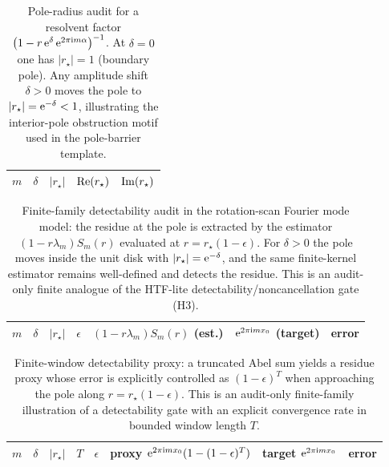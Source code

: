 \begin{table}[H]
\centering
\scriptsize
\setlength{\tabcolsep}{6pt}
\renewcommand{\arraystretch}{1.15}
\begin{tabular}{r r r r r}
\toprule
$m$ & $\delta$ & $|r_\star|$ & $\operatorname{Re}(r_\star)$ & $\operatorname{Im}(r_\star)$ \\
\midrule
%
\end{tabular}
\caption{Pole-radius audit for a resolvent factor $\bigl(1-r\,\mathrm{e}^\delta\,\mathrm{e}^{2\pi\mathrm{i} m\alpha}\bigr)^{-1}$.
At $\delta=0$ one has $|r_\star|=1$ (boundary pole). Any amplitude shift $\delta>0$ moves the pole to $|r_\star|=\mathrm{e}^{-\delta}<1$,
illustrating the interior-pole obstruction motif used in the pole-barrier template.}
\label{tab:htf_lite_resolvent_pole_audit}
\end{table}



\begin{table}[H]
\centering
\scriptsize
\setlength{\tabcolsep}{6pt}
\renewcommand{\arraystretch}{1.15}
\begin{tabular}{r r r r p{} p{} r}
\toprule
$m$ & $\delta$ & $|r_\star|$ & $\epsilon$ & $(1-r\lambda_m)S_m(r)$ (est.) & $\mathrm{e}^{2\pi\mathrm{i} m x_0}$ (target) & error \\
\midrule
%
\end{tabular}
\caption{Finite-family detectability audit in the rotation-scan Fourier mode model: the residue at the pole is extracted by the estimator $(1-r\lambda_m)S_m(r)$ evaluated at $r=r_\star(1-\epsilon)$.
For $\delta>0$ the pole moves inside the unit disk with $|r_\star|=\mathrm{e}^{-\delta}$, and the same finite-kernel estimator remains well-defined and detects the residue.
This is an audit-only finite analogue of the HTF-lite detectability/noncancellation gate (H3).}
\label{tab:htf_lite_detectability_audit}
\end{table}



\begin{table}[H]
\centering
\scriptsize
\setlength{\tabcolsep}{6pt}
\renewcommand{\arraystretch}{1.15}
\begin{tabular}{r r r r r p{} p{} r}
\toprule
$m$ & $\delta$ & $|r_\star|$ & $T$ & $\epsilon$ & proxy $\mathrm{e}^{2\pi\mathrm{i} m x_0}(1-(1-\epsilon)^T)$ & target $\mathrm{e}^{2\pi\mathrm{i} m x_0}$ & error \\
\midrule
%
\end{tabular}
\caption{Finite-window detectability proxy: a truncated Abel sum yields a residue proxy whose error is explicitly controlled as $(1-\epsilon)^T$ when approaching the pole along $r=r_\star(1-\epsilon)$.
This is an audit-only finite-family illustration of a detectability gate with an explicit convergence rate in bounded window length $T$.}
\label{tab:htf_lite_detectability_finite_window_audit}
\end{table}

